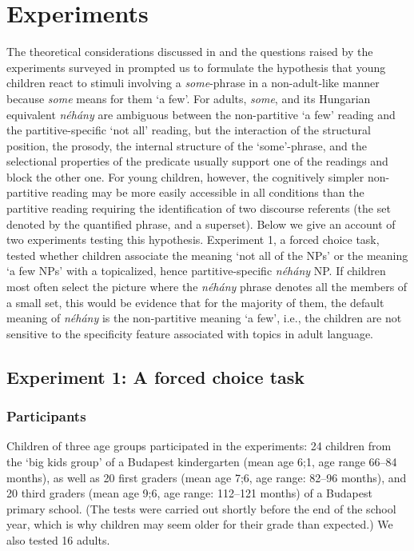 \documentclass[output=paper]{langscibook}
\begin{document}
\section{Experiments}\label{kis-zet:sec:experiments} 

The theoretical considerations discussed in  and the questions raised by the experiments surveyed in  prompted us to formulate the hypothesis that young children react to stimuli involving a \textit{some}-phrase in a non-adult-like manner because \textit{some} means for them `a few'. For adults, \textit{some}, and its Hungarian equivalent \textit{néhány} are ambiguous between the non-partitive `a few' reading and the partitive-specific `not all' reading, but the interaction of the structural position, the prosody, the internal structure of the `some'-phrase, and the selectional properties of the predicate usually support one of the readings and block the other one. For young children, however, the cognitively simpler non-partitive reading may be more easily accessible in all conditions than the partitive reading requiring the identification of two discourse referents (the set denoted by the quantified phrase, and a superset). Below we give an account of two experiments testing this hypothesis. Experiment 1, a forced choice task, tested
whether children associate the meaning `not all of the NPs' or the
meaning `a few NPs' with a topicalized, hence partitive-specific \textit{néhány} NP. If children most often select the picture where the \textit{néhány} phrase denotes all the members of a small set, this would be evidence that for the majority of them, the default meaning of \textit{néhány} is the non-partitive meaning `a few', i.e., the children are not sensitive to the specificity feature associated with topics in adult language. 

\subsection{Experiment 1: A forced choice task} 

\subsubsection{Participants}

Children of three age groups participated in the experiments: 24 children from the `big kids group' of a Budapest kindergarten (mean age 6;1, age range 66--84 months), as well as 20 first graders (mean age 7;6, age range: 82--96 months), and 20 third graders (mean age 9;6, age range: 112--121 months) of a Budapest primary school. (The tests were carried out shortly before the end of the school year, which is why children may seem older for their grade than expected.) We also tested 16 adults. 
\end{document}
